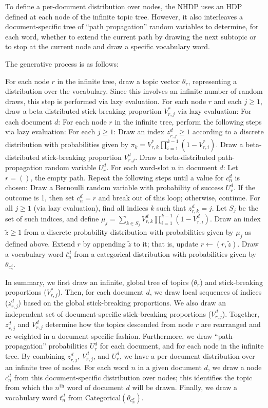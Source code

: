 \documentclass{article}
\newcommand{\nth}{^{\text{th}}}
\begin{document}
To define a per-document distribution over nodes, the NHDP uses an HDP defined at each node of the infinite topic tree.
However, it also interleaves a document-specific tree of ``path propagation'' random variables to determine, for each word, whether to extend the current path by drawing the next subtopic or to stop at the current node and draw a specific vocabulary word.

The generative process is as follows:
\begin{outline}[enumerate]
\1 For each node $r$ in the infinite tree, draw a topic vector $\theta_r$, representing a distribution over the vocabulary.
Since this involves an infinite number of random draws, this step is performed via lazy evaluation.
\1 For each node $r$ and each $j \geq 1$, draw a beta-distributed stick-breaking proportion $V^*_{r,j}$ via lazy evaluation:
\1 For each document $d$:
  \2 For each node $r$ in the infinite tree, perform the following steps via lazy evaluation:
    \3 For each $j \geq 1$:
      \4 Draw an index $z^d_{r,j} \geq 1$ according to a discrete distribution with probabilities given by $\pi_k = V^*_{r,k} \prod_{i=1}^{k-1} (1-V^*_{r,i})$.
      \4 Draw a beta-distributed stick-breaking proportion $V^d_{r,j}$.
    \3 Draw a beta-distributed path-propagation random variable $U^d_r$.
  \2 For each word-slot $n$ in document $d$:
    \3 Let $r = ()$, the empty path.
    \3 Repeat the following steps until a value for $c^d_n$ is chosen:
      \4 Draw a Bernoulli random variable with probability of success $U^d_r$.
      \4 If the outcome is 1, then set $c^d_n = r$ and break out of this loop; otherwise, continue.
      \4 For all $j \geq 1$ (via lazy evaluation), find all indices $k$ such that $z^d_{r,k} = j$.  Let $S_j$ be the set of such indices, and define $\mu_j = \sum_{k \in S_j} V^d_{r,k} \prod_{i=1}^{k-1} (1-V^d_{r,i})$.
      \4 Draw an index $\tilde z \geq 1$ from a discrete probability distribution with probabilities given by $\mu_j$ as defined above.
      \4 Extend $r$ by appending $\tilde z$ to it; that is, update $r \gets (r, \tilde z)$.
    \3 Draw a vocabulary word $t^d_n$ from a categorical distribution with probabilities given by $\theta_{c^d_n}$.
\end{outline}

In summary, we first draw an infinite, global tree of topics ($\theta_r$) and stick-breaking proportions ($V^*_{r,j}$).
Then, for each document $d$, we draw local sequences of indices ($z^d_{r,j}$) based on the global stick-breaking proportions.
We also draw an independent set of document-specific stick-breaking proportions ($V^d_{r,j}$).
Together, $z^d_{r,j}$ and $V^d_{r,j}$ determine how the topics descended from node $r$ are rearranged and re-weighted in a document-specific fashion.
Furthermore, we draw ``path-propagation'' probabilities $U^d_r$ for each document, and for each node in the infinite tree.
By combining $z^d_{r,j}$, $V^d_{r,j}$, and $U^d_r$, we have a per-document distribution over an infinite tree of nodes.
For each word $n$ in a given document $d$, we draw a node $c^d_n$ from this document-specific distribution over nodes;
this identifies the topic from which the $n\nth$ word of document $d$ will be drawn.
Finally, we draw a vocabulary word $t^d_n$ from ${\text{Categorical}(\theta_{c^d_n})}$.
\end{document}
